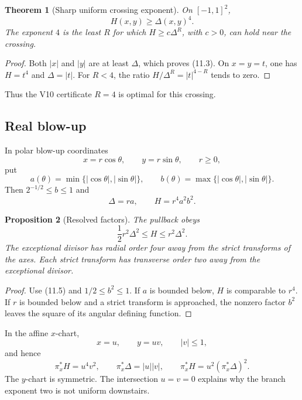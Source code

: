 \documentclass[11pt]{article}
\newtheorem{theorem}{Theorem}[section]
\newtheorem{proposition}[theorem]{Proposition}
\theoremstyle{remark}
\begin{document}
\begin{theorem}[Sharp uniform crossing exponent]
\label{thm:v17v11-sharp}
On \([-1,1]^2\),
\[
 H(x,y)\geq\Delta(x,y)^4.                          \tag{11.3}
\]
The exponent \(4\) is the least \(R\) for which
\(H\geq c\Delta^R\), with \(c>0\), can hold near the crossing.
\end{theorem}

\begin{proof}
Both \(|x|\) and \(|y|\) are at least \(\Delta\), which proves
(11.3).  On \(x=y=t\), one has \(H=t^4\) and \(\Delta=|t|\).
For \(R<4\), the ratio \(H/\Delta^R=|t|^{4-R}\) tends to zero.
\end{proof}

Thus the V10 certificate \(R=4\) is optimal for this crossing.

\subsection{Real blow-up}

In polar blow-up coordinates
\[
 x=r\cos\theta,\qquad y=r\sin\theta,\qquad r\geq0, \tag{11.4}
\]
put
\[
 a(\theta)=\min\{|\cos\theta|,|\sin\theta|\},
 \qquad
 b(\theta)=\max\{|\cos\theta|,|\sin\theta|\}.
\]
Then \(2^{-1/2}\leq b\leq1\) and
\[
 \Delta=ra,\qquad H=r^4a^2b^2.                    \tag{11.5}
\]

\begin{proposition}[Resolved factors]
\label{prop:v17v11-polar}
The pullback obeys
\[
 \frac12r^2\Delta^2\leq H\leq r^2\Delta^2.         \tag{11.6}
\]
The exceptional divisor has radial order four away from the strict
transforms of the axes.  Each strict transform has transverse order
two away from the exceptional divisor.
\end{proposition}

\begin{proof}
Use (11.5) and \(1/2\leq b^2\leq1\).  If \(a\) is bounded below,
\(H\) is comparable to \(r^4\).  If \(r\) is bounded below and a
strict transform is approached, the nonzero factor \(b^2\) leaves
the square of its angular defining function.
\end{proof}

In the affine \(x\)-chart,
\[
 x=u,\qquad y=uv,\qquad |v|\leq1,
\]
and hence
\[
 \pi_x^*H=u^4v^2,\qquad
 \pi_x^*\Delta=|u||v|,\qquad
 \pi_x^*H=u^2(\pi_x^*\Delta)^2.                   \tag{11.7}
\]
The \(y\)-chart is symmetric.  The intersection \(u=v=0\) explains
why the branch exponent two is not uniform downstairs.
\end{document}
